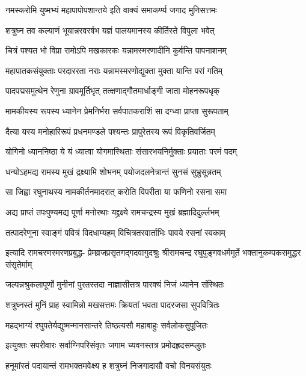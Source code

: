 \twolineshloka
{नमस्करोमि युष्मभ्यं महापापोपशान्तये}
{इति वाक्यं समाकर्ण्य जगाद मुनिसत्तमः}%

\twolineshloka
{शत्रुघ्न तव कल्याणं भूयान्नरवरर्षभ}
{यज्ञं पालयमानस्य कीर्तिस्ते विपुला भवेत्}%

\twolineshloka
{चित्रं पश्यत भो विप्रा रामोऽपि मखकारकः}
{यन्नामस्मरणादीनि कुर्वन्ति पापनाशनम्}%

\twolineshloka
{महापातकसंयुक्ताः परदाररता नराः}
{यन्नामस्मरणोद्युक्ता मुक्ता यान्ति परां गतिम्}%

\twolineshloka
{पादपद्मसमुत्थेन रेणुना ग्रावमूर्तिभृत्}
{तत्क्षणाद्गौतमार्धाङ्गी जाता मोहनरूपधृक्}%

\twolineshloka
{मामकीयस्य रूपस्य ध्यानेन प्रेमनिर्भरा}
{सर्वपातकराशिं सा दग्ध्वा प्राप्ता सुरूपताम्}%

\twolineshloka
{दैत्या यस्य मनोहारिरूपं प्रधनमण्डले}
{पश्यन्तः प्रापुरेतस्य रूपं विकृतिवर्जितम्}%

\twolineshloka
{योगिनो ध्याननिष्ठा ये यं ध्यात्वा योगमास्थिताः}
{संसारभयनिर्मुक्ताः प्रयाताः परमं पदम्}%

\twolineshloka
{धन्योऽहमद्य रामस्य मुखं द्रक्ष्यामि शोभनम्}
{पयोजदलनेत्रान्तं सुनसं सुभ्रुसून्नतम्}%

\twolineshloka
{सा जिह्वा रघुनाथस्य नामकीर्तनमादरात्}
{करोति विपरीता या फणिनो रसना समा}%

\twolineshloka
{अद्य प्राप्तं तपःपुण्यमद्य पूर्णा मनोरथाः}
{यद्द्रक्ष्ये रामचन्द्रस्य मुखं ब्रह्मादिदुर्ल्लभम्}%

\twolineshloka
{तत्पादरेणुना स्वाङ्गं पवित्रं विदधाम्यहम्}
{विचित्रतरवार्ताभिः पावये रसनां स्वकाम्}%

\fourlineindentedshloka
{इत्यादि रामचरणस्मरणप्रबुद्ध-}
{प्रेमव्रजप्रसृतगद्गदवागुदश्रुः}
{श्रीरामचन्द्र रघुपुङ्गवधर्ममूर्ते}
{भक्तानुकम्पकसमुद्धर संसृतेर्माम्}%

\twolineshloka
{जल्पन्नश्रुकलापूर्णो मुनीनां पुरतस्तदा}
{नाज्ञासीत्तत्र पारक्यं निजं ध्यानेन संस्थितः}%

\twolineshloka
{शत्रुघ्नस्तं मुनिं प्राह स्वामिन्नो मखसत्तमः}
{क्रियतां भवता पादरजसा सुपवित्रितः}%

\twolineshloka
{महद्भाग्यं रघुपतेर्यद्युष्मन्मानसान्तरे}
{तिष्ठत्यसौ महाबाहुः सर्वलोकसुपूजितः}%

\twolineshloka
{इत्युक्तः सपरीवारः सर्वाग्निपरिसंवृतः}
{जगाम च्यवनस्तत्र प्रमोदह्रदसम्प्लुतः}%

\twolineshloka
{हनूमांस्तं पदायान्तं रामभक्तमवेक्ष्य ह}
{शत्रुघ्नं निजगादासौ वचो विनयसंयुतः}%

